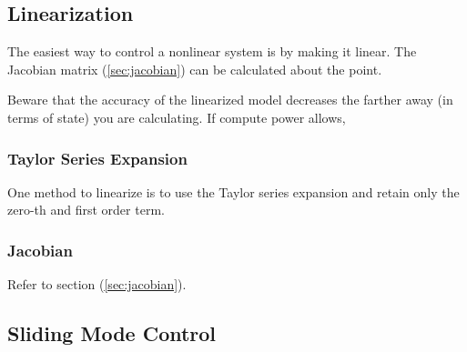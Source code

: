\documentclass[../notes.tex]{subfiles}
\begin{document}
\subsection{Linearization}
The easiest way to control a nonlinear system is by making it linear. The Jacobian matrix (\underline{\ref{sec:jacobian}}) can be calculated about the point.
\begin{emphasis}
    Beware that the accuracy of the linearized model decreases the farther away (in terms of state) you are calculating. If compute power allows, 
\end{emphasis}
\subsubsection{Taylor Series Expansion}
One method to linearize is to use the Taylor series expansion and retain only the zero-th and first order term.
\subsubsection{Jacobian}
Refer to section (\underline{\ref{sec:jacobian}}).
\subsection{Sliding Mode Control}
\end{document}
